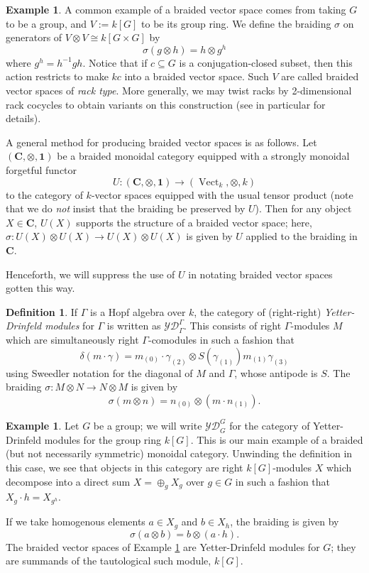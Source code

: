 \documentclass[12pt]{article}
\DeclareMathOperator{\Vect}{Vect}
\newcommand{\bC} {\mathbf{C}}
\newcommand{\one} {\mathbf{1}}
\theoremstyle{plain}
\theoremstyle{definition}
\newtheorem{defn}[thm]{Definition}
\newtheorem{exmp}[thm]{Example}
\theoremstyle{remark}
\begin{document}
\begin{exmp} \label{rack_exmp} A common example of a braided vector space comes from taking $G$ to be a group, and $V := k[G]$ to be its group ring.  We define the braiding $\sigma$ on generators of $V \otimes V \cong k[G \times G]$ by 
%
$$\sigma(g \otimes h) = h \otimes g^h$$
%
where $g^h = h^{-1} g h$.  Notice that if $c \subseteq G$ is a conjugation-closed subset, then this action restricts to make $kc$ into a braided vector space.  Such $V$ are called braided vector spaces of \emph{rack type}.  More generally, we may twist racks by 2-dimensional rack cocycles to obtain variants on this construction (see \cite{andruskiewitsch-grana} in particular for details).

\end{exmp}

A general method for producing braided vector spaces is as follows.  Let $(\bC, \otimes, \one)$ be a braided monoidal category equipped with a strongly monoidal forgetful functor 
%
$$U: (\bC, \otimes, \one) \to (\Vect_k, \otimes, k)$$
%
to the category of $k$-vector spaces equipped with the usual tensor product (note that we do \emph{not} insist that the braiding be preserved by $U$).  Then for any object $X \in \bC$, $U(X)$ supports the structure of a braided vector space; here, $\sigma: U(X) \otimes U(X) \to U(X) \otimes U(X)$ is given by $U$ applied to the braiding in $\bC$.

Henceforth, we will suppress the use of $U$ in notating braided vector spaces gotten this way.

\begin{defn}

If $\Gamma$ is a Hopf algebra over $k$, the category of (right-right) \emph{Yetter-Drinfeld modules} for $\Gamma$ is written as $\mathcal{YD}^{\Gamma}_{\Gamma}$.  This consists of right $\Gamma$-modules $M$ which are simultaneously right $\Gamma$-comodules in such a fashion that
%
$$\delta(m \cdot \gamma ) = m_{(0)} \cdot \gamma_{(2)} \otimes S(\gamma_{(1)}) m_{(1)} \gamma_{(3)}$$ 
%
using Sweedler notation for the diagonal of $M$ and $\Gamma$, whose antipode is $S$.  The braiding $\sigma: M \otimes N \to N \otimes M$ is given by
%
$$\sigma(m \otimes n) = n_{(0)} \otimes (m \cdot n_{(1)}).$$

\end{defn}

\begin{exmp} Let $G$ be a group; we will write $\mathcal{YD}_G^G$ for the category of Yetter-Drinfeld modules for the group ring $k[G]$.  This is our main example of a braided (but not necessarily symmetric) monoidal category.  Unwinding the definition in this case, we see that objects in this category are right $k[G]$-modules $X$ which decompose into a direct sum $X = \oplus_g X_g$ over $g \in G$ in such a fashion that $X_g \cdot h = X_{g^h}$. 

If we take homogenous elements $a \in X_g$ and $b \in X_h$, the braiding is given by 
%
$$\sigma(a \otimes b) = b \otimes (a \cdot h).$$ 
%
The braided vector spaces of Example \ref{rack_exmp} are Yetter-Drinfeld modules for $G$; they are summands of the tautological such module, $k[G]$.
\end{exmp}
\end{document}
